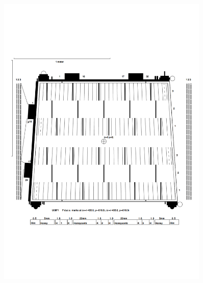 \begin{figure}[H]
		\begin{minipage}{0.49\hsize}
		\centering
        \includegraphics[width=0.9\textwidth]{img/pdf/u08f1i.pdf}
        \subcaption{}
        \end{minipage}
        \begin{minipage}{0.49\hsize}
        \centering

\end{minipage}
\end{figure}
